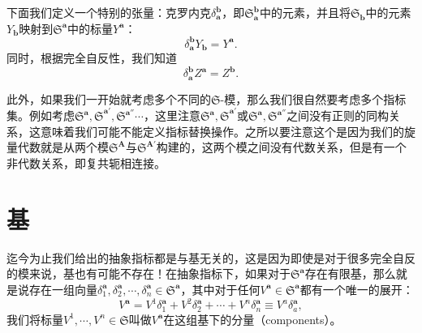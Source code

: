 下面我们定义一个特别的张量：克罗内克$\delta _{\boldsymbol{a}}^{\boldsymbol{b}}$，即$\mathfrak{S}_{\boldsymbol{a}}^{\boldsymbol{b}}$中的元素，并且将$\mathfrak{S}_{\boldsymbol{b}}$中的元素$Y_{\boldsymbol{b}}$映射到$\mathfrak{S}^{\boldsymbol{a}}$中的标量$Y^{\boldsymbol{a}}$：
\begin{equation*}
	\delta _{\boldsymbol{a}}^{\boldsymbol{b}} Y_{\boldsymbol{b}} =Y^{\boldsymbol{a}} .
\end{equation*}
同时，根据完全自反性，我们知道
\begin{equation*}
	\delta _{\boldsymbol{a}}^{\boldsymbol{b}} Z^{\boldsymbol{a}} =Z^{\boldsymbol{b}} .
\end{equation*}


此外，如果我们一开始就考虑多个不同的$\mathfrak{S}$-模，那么我们很自然要考虑多个指标集。例如考虑$\mathfrak{S^{\boldsymbol{a}} ,S}^{\boldsymbol{a} '} ,\mathfrak{S}^{\boldsymbol{a} ''} \cdots $，这里注意$\mathfrak{S^{\boldsymbol{a}} ,S}^{\boldsymbol{a} '}$或$\mathfrak{S^{\boldsymbol{a}}} ,\mathfrak{S}^{\boldsymbol{a} ''}$之间没有正则的同构关系，这意味着我们可能不能定义指标替换操作。之所以要注意这个是因为我们的旋量代数就是从两个模$\mathfrak{S}^{\boldsymbol{A}}$与$\mathfrak{S}^{\boldsymbol{A} '}$构建的，这两个模之间没有代数关系，但是有一个非代数关系，即复共轭相连接。


\section{基}

迄今为止我们给出的抽象指标都是与基无关的，这是因为即使是对于很多完全自反的模来说，基也有可能不存在！在抽象指标下，如果对于$\mathfrak{S}^{\boldsymbol{a}}$存在有限基，那么就是说存在一组向量$\delta _{1}^{\boldsymbol{a}} ,\delta _{2}^{\boldsymbol{a}} ,\cdots ,\delta _{n}^{\boldsymbol{a}} \in \mathfrak{S}^{\boldsymbol{a}}$，其中对于任何$V^{\boldsymbol{a}}\mathfrak{\in S}^{\boldsymbol{a}}$都有一个唯一的展开：
\begin{equation*}
	V^{\boldsymbol{a}} =V^{1} \delta _{1}^{\boldsymbol{a}} +V^{2} \delta _{2}^{\boldsymbol{a}} +\cdots +V^{n} \delta _{n}^{\boldsymbol{a}} \equiv V^{a} \delta _{a}^{\boldsymbol{a}} ,
\end{equation*}
我们将标量$V^{1} ,\cdots ,V^{n} \in \mathfrak{S}$叫做$V^{\boldsymbol{a}}$在这组基下的分量（components）。



